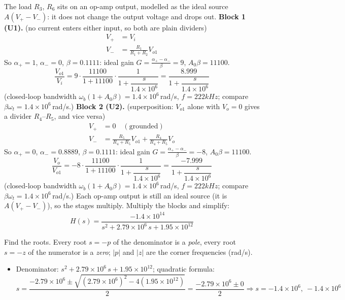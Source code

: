 \documentclass[11pt]{article}
\newcommand{\solstep}[2]{\par\medskip{\color{stepc}\textbf{Step #1 --- #2}}\par\nopagebreak}
\begin{document}
The load $R_{3}$, $R_{6}$ sits on an op-amp output, modelled as the ideal source $A(V_+-V_-)$: it does not change the output voltage and drops out.
\textbf{Block 1 (U1).} (no current enters either input, so both are plain dividers)\begin{align*}
V_+ &= V_{i} \\
V_- &= \frac{R_{1}}{R_{1}+R_{2}}V_{o1}
\end{align*}
So $\alpha_+ = 1$, $\alpha_- = 0$, $\beta = 0.1111$: ideal gain $G = \frac{\alpha_+-\alpha_-}{\beta} = 9$, $A_0\beta = 11100$.\[
\frac{V_{o1}}{V_{i}} = 9\cdot\frac{11100}{1+11100}\cdot\frac{1}{1+\dfrac{s}{1.4\times 10^{6}}} = \frac{8.999}{1+\dfrac{s}{1.4\times 10^{6}}}
\]
(closed-loop bandwidth $\omega_b(1+A_0\beta) = 1.4\times 10^{6}$\,rad/s, $f = 222 kHz$; compare $\beta\omega_t = 1.4\times 10^{6}$\,rad/s.)
\textbf{Block 2 (U2).} (superposition: $V_{o1}$ alone with $V_{o}=0$ gives a divider $R_{4}$--$R_{5}$, and vice versa)\begin{align*}
V_+ &= 0 \quad(\text{grounded}) \\
V_- &= \frac{R_{5}}{R_{4}+R_{5}}V_{o1} + \frac{R_{4}}{R_{4}+R_{5}}V_{o}
\end{align*}
So $\alpha_+ = 0$, $\alpha_- = 0.8889$, $\beta = 0.1111$: ideal gain $G = \frac{\alpha_+-\alpha_-}{\beta} = -8$, $A_0\beta = 11100$.\[
\frac{V_{o}}{V_{o1}} = -8\cdot\frac{11100}{1+11100}\cdot\frac{1}{1+\dfrac{s}{1.4\times 10^{6}}} = \frac{-7.999}{1+\dfrac{s}{1.4\times 10^{6}}}
\]
(closed-loop bandwidth $\omega_b(1+A_0\beta) = 1.4\times 10^{6}$\,rad/s, $f = 222 kHz$; compare $\beta\omega_t = 1.4\times 10^{6}$\,rad/s.)
Each op-amp output is still an ideal source (it is $A(V_+-V_-)$), so the stages multiply.
Multiply the blocks and simplify:\[
H(s) = \dfrac{-1.4\times 10^{14}}{s^{2} + 2.79\times 10^{6}\,s + 1.95\times 10^{12}}
\]

\solstep{5}{Standard (Bode-ready) form}Find the roots. Every root $s=-p$ of the denominator is a \emph{pole}, every root $s=-z$ of the numerator is a \emph{zero}; $|p|$ and $|z|$ are the corner frequencies (rad/s).
\begin{itemize}[leftmargin=*,itemsep=2pt]
\item Denominator: $s^{2} + 2.79\times 10^{6}\,s + 1.95\times 10^{12}$; quadratic formula:\[
s = \frac{-2.79\times 10^{6} \pm \sqrt{(2.79\times 10^{6})^2 - 4(1.95\times 10^{12})}}{2} = \frac{-2.79\times 10^{6} \pm 0}{2} \Rightarrow s = -1.4\times 10^{6},\ -1.4\times 10^{6}
\]

\end{itemize}
\end{document}
